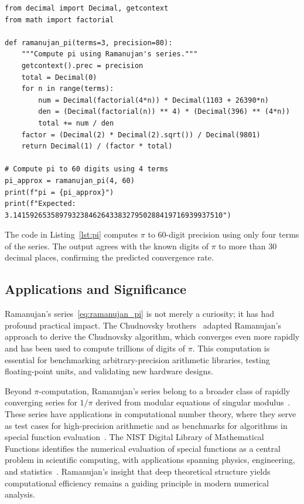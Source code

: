 \documentclass[10pt]{amsart}
\theoremstyle{plain}
\theoremstyle{definition}
\theoremstyle{remark}
\begin{document}
\begin{lstlisting}[label=lst:pi, caption={Computing $\pi$ using Ramanujan's series.}]
from decimal import Decimal, getcontext
from math import factorial

def ramanujan_pi(terms=3, precision=80):
    """Compute pi using Ramanujan's series."""
    getcontext().prec = precision
    total = Decimal(0)
    for n in range(terms):
        num = Decimal(factorial(4*n)) * Decimal(1103 + 26390*n)
        den = (Decimal(factorial(n)) ** 4) * (Decimal(396) ** (4*n))
        total += num / den
    factor = (Decimal(2) * Decimal(2).sqrt()) / Decimal(9801)
    return Decimal(1) / (factor * total)

# Compute pi to 60 digits using 4 terms
pi_approx = ramanujan_pi(4, 60)
print(f"pi = {pi_approx}")
print(f"Expected: 3.14159265358979323846264338327950288419716939937510")
\end{lstlisting}

The code in Listing~\ref{lst:pi} computes $\pi$ to $60$-digit precision
using only four terms of the series. The output agrees with the known
digits of $\pi$ to more than $30$ decimal places, confirming the
predicted convergence rate.

\subsection{Applications and Significance}

Ramanujan's series~\eqref{eq:ramanujan_pi} is not merely a curiosity;
it has had profound practical impact. The Chudnovsky brothers~\cite{chudnovsky_1989}
adapted Ramanujan's approach to derive the Chudnovsky algorithm, which
converges even more rapidly and has been used to compute trillions of
digits of $\pi$. This computation is essential for benchmarking
arbitrary-precision arithmetic libraries, testing floating-point units,
and validating new hardware designs.

Beyond $\pi$-computation, Ramanujan's series belong to a broader class
of rapidly converging series for $1/\pi$ derived from modular equations
of singular modulus~\cite{berndt_1985}. These series have applications
in computational number theory, where they serve as test cases for
high-precision arithmetic and as benchmarks for algorithms in special
function evaluation~\cite{nist_special, lozier_olver}. The NIST Digital
Library of Mathematical Functions identifies the numerical evaluation of
special functions as a central problem in scientific computing, with
applications spanning physics, engineering, and statistics~\cite{nist_special}.
Ramanujan's insight that deep theoretical structure yields computational
efficiency remains a guiding principle in modern numerical analysis.
\end{document}
